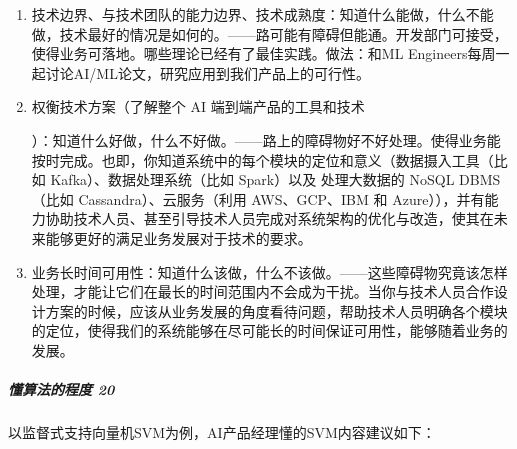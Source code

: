 \documentclass[letterpaper,11pt,english]{sphinxmanual}
\begin{document}
\begin{enumerate}
\item {} 
技术边界、与技术团队的能力边界、技术成熟度：知道什么能做，什么不能做，技术最好的情况是如何的。——路可能有障碍但能通。开发部门可接受，使得业务可落地。哪些理论已经有了最佳实践。做法：和ML
Engineers每周一起讨论AI/ML论文，研究应用到我们产品上的可行性。%
\begin{footnote}[366]\sphinxAtStartFootnote
{}
%
\end{footnote}

\item {} 
权衡技术方案（了解整个 AI
端到端产品的工具和技术%
\begin{footnote}[367]\sphinxAtStartFootnote
{}
%
\end{footnote}）：知道什么好做，什么不好做。——路上的障碍物好不好处理。使得业务能按时完成。也即，你知道系统中的每个模块的定位和意义（数据摄入工具（比如
Kafka）、数据处理系统（比如 Spark）以及 处理大数据的 NoSQL DBMS（比如
Cassandra）、云服务（利用 AWS、GCP、IBM 和
Azure）），并有能力协助技术人员、甚至引导技术人员完成对系统架构的优化与改造，使其在未来能够更好的满足业务发展对于技术的要求。

\item {} 
业务长时间可用性：知道什么该做，什么不该做。——这些障碍物究竟该怎样处理，才能让它们在最长的时间范围内不会成为干扰。当你与技术人员合作设计方案的时候，应该从业务发展的角度看待问题，帮助技术人员明确各个模块的定位，使得我们的系统能够在尽可能长的时间保证可用性，能够随着业务的发展。

\end{enumerate}


\subparagraph{懂算法的程度 20\sphinxfootnotemark[368]}
\label{\detokenize{chapter_idea/understand_tech:id5}}%
\begin{footnotetext}[368]\sphinxAtStartFootnote
{}
%
\end{footnotetext}\ignorespaces 
以监督式支持向量机SVM为例，AI产品经理懂的SVM内容建议如下：

\end{document}
